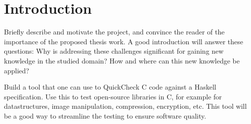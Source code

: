 \section{Introduction}

Briefly describe and motivate the project, and convince the reader of the importance of the proposed thesis work.
A good introduction will answer these questions:
Why is addressing these challenges significant for gaining new knowledge in the studied domain?
How and where can this new knowledge be applied?

Build a tool that one can use to QuickCheck C code against a Haskell specification.
Use this to test open-source libraries in C, for example for datastructures, image manipulation, compression, encryption, etc.
This tool will be a good way to streamline the testing to ensure software quality.
